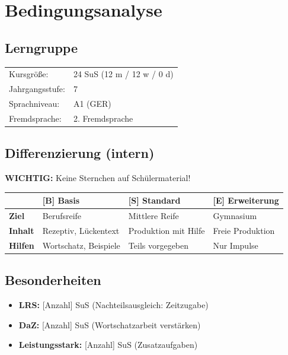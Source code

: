 \documentclass[11pt,a4paper]{article}
\newcommand{\jahrgangsstufe}{7}
\newcommand{\lerngruppengroesse}{24}
\newcommand{\maennlich}{12}
\newcommand{\weiblich}{12}
\newcommand{\divers}{0}
\newcommand{\gerniveau}{A1}                        %
\begin{document}
\section{Bedingungsanalyse}

\subsection{Lerngruppe}
\begin{tabular}{ll}
    Kursgröße: & \lerngruppengroesse{} SuS (\maennlich{} m / \weiblich{} w / \divers{} d) \\
    Jahrgangsstufe: & \jahrgangsstufe \\
    Sprachniveau: & \gerniveau{} (GER) \\
    Fremdsprache: & 2. Fremdsprache \\
\end{tabular}

\subsection{Differenzierung (intern)}

\textbf{WICHTIG:} Keine Sternchen auf Schülermaterial!

\begin{tabular}{|l|p{4cm}|p{4cm}|p{4cm}|}
\hline
& \textbf{[B] Basis} & \textbf{[S] Standard} & \textbf{[E] Erweiterung} \\
\hline
\textbf{Ziel} & Berufsreife & Mittlere Reife & Gymnasium \\
\hline
\textbf{Inhalt} & Rezeptiv, Lückentext & Produktion mit Hilfe & Freie Produktion \\
\hline
\textbf{Hilfen} & Wortschatz, Beispiele & Teils vorgegeben & Nur Impulse \\
\hline
\end{tabular}

\subsection{Besonderheiten}
\begin{itemize}
    \item \textbf{LRS:} [Anzahl] SuS (Nachteilsausgleich: Zeitzugabe)
    \item \textbf{DaZ:} [Anzahl] SuS (Wortschatzarbeit verstärken)
    \item \textbf{Leistungsstark:} [Anzahl] SuS (Zusatzaufgaben)
\end{itemize}
\end{document}
